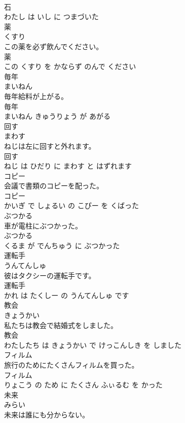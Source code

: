 \documentclass[8pt]{extreport}
\begin{document}
\begin{CJK}{UTF8}{min}
\\	石 
\\	わたし は いし に つまづいた			
\\	薬	
\\	くすり			
\\	この薬を必ず飲んでください。	
\\	薬 
\\	この くすり を かならず のんで ください			
\\	毎年	
\\	まいねん			
\\	毎年給料が上がる。	
\\	毎年 
\\	まいねん きゅうりょう が あがる			
\\	回す	
\\	まわす			
\\	ねじは左に回すと外れます。	
\\	回す 
\\	ねじ は ひだり に まわす と はずれます			
\\	コピー	
\\	会議で書類のコピーを配った。	
\\	コピー 
\\	かいぎ で しょるい の こぴー を くばった			
\\	ぶつかる	
\\	車が電柱にぶつかった。	
\\	ぶつかる 
\\	くるま が でんちゅう に ぶつかった			
\\	運転手	
\\	うんてんしゅ			
\\	彼はタクシーの運転手です。	
\\	運転手 
\\	かれ は たくしー の うんてんしゅ です			
\\	教会	
\\	きょうかい			
\\	私たちは教会で結婚式をしました。	
\\	教会 
\\	わたしたち は きょうかい で けっこんしき を しました			
\\	フィルム	
\\	旅行のためにたくさんフィルムを買った。	
\\	フィルム 
\\	りょこう の ため に たくさん ふぃるむ を かった			
\\	未来	
\\	みらい			
\\	未来は誰にも分からない。	

\end{CJK}
\end{document}
